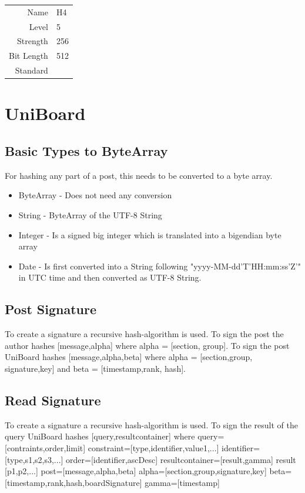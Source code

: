 \documentclass[bibtotoc,halfparskip,oneside]{scrreprt}
\begin{document}
\begin{tabularx}{\textwidth}{rX}
Name & \textsf{H4} \\
Level & 5 \\
Strength & 256 \\
Bit Length & 512 \\
Standard & 
\end{tabularx}


\chapter{UniBoard}

\section{Basic Types to ByteArray}
For hashing any part of a post, this needs to be converted to a byte array.
\begin{itemize}
	\item ByteArray - Does not need any conversion
	\item String - ByteArray of the UTF-8 String
	\item Integer - Is a signed big integer which is translated into a bigendian byte array
	\item Date - Is first converted into a String following "yyyy-MM-dd'T'HH:mm:ss'Z'" in UTC time and then converted as UTF-8 String.
\end{itemize}
\section{Post Signature}
To create a signature a recursive hash-algorithm is used.
To sign the post the author hashes [message,alpha] where alpha  = [section, group].
To sign the post UniBoard  hashes [message,alpha,beta] where alpha = [section,group, signature,key] and
beta = [timestamp,rank, hash].
\section{Read Signature}
To create a signature a recursive hash-algorithm is used.
To sign the result of the query UniBoard hashes [query,resultcontainer] where query=[contraints,order,limit]
constraint=[type,identifier,value1,...] identifier=[type,s1,s2,s3,...] order=[identifier,ascDesc] resultcontainer=[result,gamma]
result [p1,p2,...] post=[message,alpha,beta] alpha=[section,group,signature,key] beta=[timestamp,rank,hash,boardSignature] gamma=[timestamp]
\end{document}
